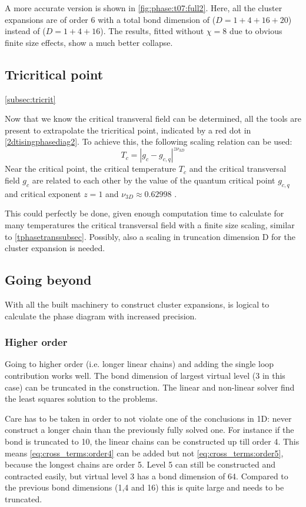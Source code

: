 A more accurate version is shown in \cref{fig:phase:t07:full2}. Here, all the cluster expansions are of order 6 with a total bond dimension of ($D = 1+4+16+20$) instead of ($D = 1+4+16$). The results, fitted without $\chi=8$ due to obvious finite size effects, show a much better collapse.

\subsection{Tricritical point}\cref{subsec:tricrit}

Now that we know the critical transveral field can be determined, all the tools are present to extrapolate the tricritical point, indicated by a red dot in \cref{2dtisingphasediag2}. To achieve this, the following scaling relation can be used:
\begin{equation}
    T_c = \left| g_c-g_{c,q} \right|^{z \nu_{3D}}
\end{equation}
Near the critical point, the critical temperature $T_c$ and the critical transversal field $g_c$ are related to each other by the value of the quantum critical point $g_{c,q}$ and critical exponent $z=1$ and $\nu_{3D} \approx 0.62998$ \cite{Hesselmann2016}.

This could perfectly be done, given enough computation time to calculate for many temperatures the critical transversal field with a finite size scaling, similar to \cref{tphasetranssubsec}. Possibly, also a scaling in truncation dimension D for the cluster expansion is needed.

\subsection{Going beyond }
With all the built machinery to construct cluster expansions, is logical to calculate the phase diagram with increased precision.

\subsubsection{Higher order}

Going to higher order (i.e. longer linear chains) and adding the single loop contribution works well. The bond dimension of largest virtual level (3 in this case) can be truncated in the construction. The linear and non-linear solver find the least squares solution to the problems.

Care has to be taken in order to not violate one of the conclusions in 1D: never construct a longer chain than the previously fully solved one. For instance if the bond is truncated to 10, the linear chains can be constructed up till order 4. This means \cref{eq:cross_terms:order4} can be added but not \cref{eq:cross_terms:order5}, because the longest chains are order 5. Level 5 can still be constructed and contracted easily, but virtual level 3 has a bond dimension of 64. Compared to the previous bond dimensions (1,4 and 16) this is quite large and needs to be truncated.

